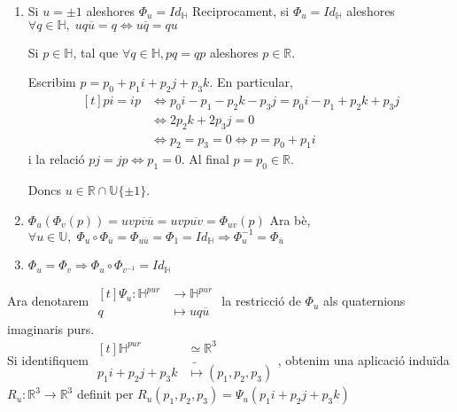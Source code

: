 \documentclass[../main.tex]{subfiles}
\begin{document}
	\begin{demostracio}
		\begin{enumerate}
			\item Si $u = \pm 1$ aleshores $\Phi_u = Id_\mathbb{H}$ Reciprocament, si $\Phi_u = Id_\mathbb{H}$ aleshores $\forall q \in \mathbb{H},\; uq\overline{u} = q \iff u\overline{q} = qu$
			\begin{lema}
				Si $p \in \mathbb{H}$, tal que $\forall q \in \mathbb{H}, pq = qp$ aleshores $p \in \mathbb{R}$.
			\end{lema}
			\begin{demostracio}
				Escribim $p = p_0 + p_1i + p_2j + p_3k$. En particular,
				\begin{displaymath}
					\begin{aligned}[t]
						pi = ip &\iff p_0i - p_1 - p_2k - p_3j = p_0i - p_1 + p_2k + p_3j\\
						&\iff 2p_2k + 2p_3j = 0\\
						&\iff p_2 = p_3 = 0 \iff p = p_0 + p_1i
					\end{aligned}
				\end{displaymath}
				i la relació $pj = jp \iff p_1 = 0$. Al final $p = p_0 \in \mathbb{R}$.
			\end{demostracio}
			Doncs $u \in \mathbb{R}\cap\mathbb{U} \{\pm 1\}$.
			\item $\Phi_u(\Phi_v(p)) = uvp\overline{v}\overline{u} = uvp\overline{uv} = \Phi_{uv}(p)$
			Ara bè, $\forall u \in \mathbb{U},\;\Phi_u\circ\Phi_{\overline{u}} = \Phi_{u\overline{u}} = \Phi_1 = Id_\mathbb{H} \Rightarrow \Phi_{u}^{-1} = \Phi_{\overline{u}}$
			\item $\Phi_u = \Phi_v \Rightarrow \Phi_u \circ \Phi_{v^{-1}} = Id_\mathbb{H}$
		\end{enumerate}
	\end{demostracio}
	Ara denotarem $\begin{aligned}[t]\Psi_u: \mathbb{H}^{pur} &\to \mathbb{H}^{pur}\\q &\mapsto uq\overline{u}\end{aligned}$ la restricció de $\Phi_u$ als quaternions imaginaris purs.\\
	Si identifiquem $\begin{aligned}[t]\mathbb{H}^{pur} &\simeq \mathbb{R}^3\\p_1i+p_2j+p_3k &\tilde{\mapsto} (p_1, p_2, p_3)\end{aligned}$, obtenim una aplicació induïda $R_u: \mathbb{R}^3 \to \mathbb{R}^3$ definit per $R_u(p_1, p_2, p_3) = \Psi_u(p_1i+p_2j+p_3k)$\\
\end{document}
